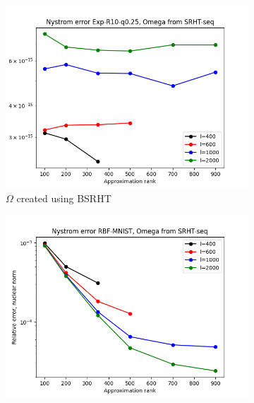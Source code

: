 \documentclass{article}
\theoremstyle{definition}
\begin{document}
\begin{appendices}
\begin{figure}
\begin{subfigure}[t]{\textwidth+20pt\relax}
    \includegraphics[width=\dimexpr\linewidth-20pt\relax]{plots/relerror/relerror_Exp-R10-q0.25_SRHT-seq.png}
    \caption{$\Omega$ created using BSRHT}
\end{subfigure}\hfill
\begin{subfigure}[t]{0.35\textwidth}
    \includegraphics[width=\textwidth]{plots/relerror/relerror_RBF-MNIST_SRHT-seq.png}

\end{subfigure}
\end{figure}
\end{appendices}
\end{document}
